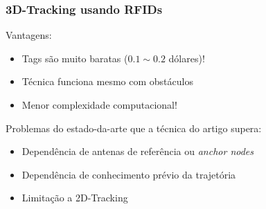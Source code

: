 \begin{frame}
  \frametitle{3D-Tracking usando RFIDs}

  Vantagens:
  \begin{itemize}
    \item  Tags são muito baratas ($0.1 \sim 0.2$ dólares)!
    \item  Técnica funciona mesmo com obstáculos
    \item  Menor complexidade computacional!
  \end{itemize}

  Problemas do estado-da-arte que a técnica do artigo supera:
  \begin{itemize}
    \item  Dependência de antenas de referência ou \emph{anchor nodes}
    \item  Dependência de conhecimento prévio da trajetória
    \item  Limitação a 2D-Tracking
  \end{itemize}
\end{frame}
